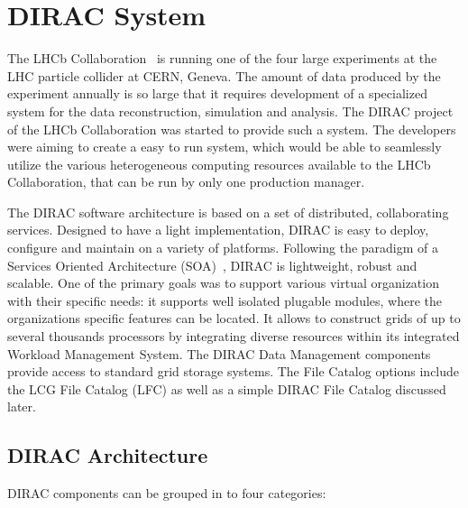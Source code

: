 \chapter{DIRAC System}
\label{chap:DIRAC}

The LHCb Collaboration~\cite{LHCb} is running one of the four large experiments at the LHC particle 
collider at CERN, Geneva. The amount of data produced by the experiment
annually is so large that it requires development of a specialized system for the data reconstruction, simulation 
and analysis. The DIRAC project of the LHCb Collaboration was started to
provide such a system.\cite{Dir2} The developers were aiming to create a easy to run system, which would be able 
to seamlessly utilize the various heterogeneous computing resources available to the LHCb Collaboration, 
that can be run by only one production manager. 

The DIRAC software architecture is based on a set of distributed, collaborating services. Designed to have a
light implementation, DIRAC is easy to deploy, configure and maintain on a variety of platforms. Following
the paradigm of a Services Oriented Architecture (SOA)~\cite{SOA}, DIRAC is lightweight, robust and scalable. 
One of the primary goals was to support various virtual organization with their specific needs: it supports well 
isolated plugable modules, where the organizations specific features can be located. It allows to construct
grids of up to several thousands processors by integrating diverse resources within its integrated Workload
Management System. The DIRAC Data Management components provide access to standard grid storage systems. 
The File Catalog options include the LCG File Catalog (LFC) as well as a simple DIRAC File Catalog discussed later. 

\section{DIRAC Architecture}
DIRAC components can be grouped in to four categories: 

